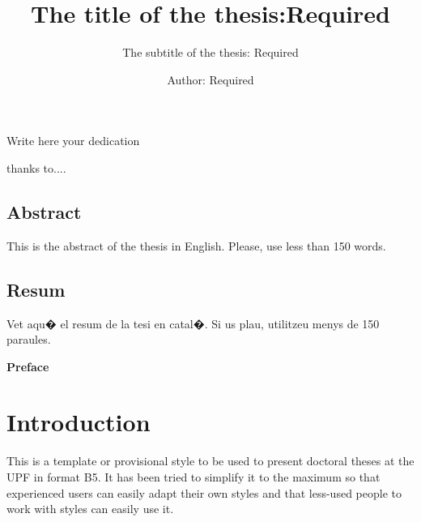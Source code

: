\documentclass[12pt, b5paper,twoside]{tesi_upf}
\title{The title of the thesis:Required}
\subtitle{The subtitle of the thesis: Required}
\author{Author: Required}
\begin{document}
\frontmatter

\maketitle

\cleardoublepage



\noindent Write here your dedication

\cleardoublepage



 thanks to....

\cleardoublepage


\section*{\Large \sffamily Abstract}
This is the abstract of the thesis in English.  Please, use less
than 150 words.

\vspace*{\fill}
\section*{\Large \sffamily  Resum}
Vet aqu� el resum de la tesi en catal�.  Si us plau, utilitzeu
menys de 150 paraules.
\vspace*{\fill}

\cleardoublepage

{\bf Preface}

\cleardoublepage


\tableofcontents

\listoffigures

\listoftables

\mainmatter
\chapter*{Introduction}

This is a template or provisional style to be used to present doctoral theses at the UPF in format B5. It has been tried to simplify it to the maximum so that experienced users can easily adapt their own styles and that less-used people to work with styles can easily use it. 
\end{document}
